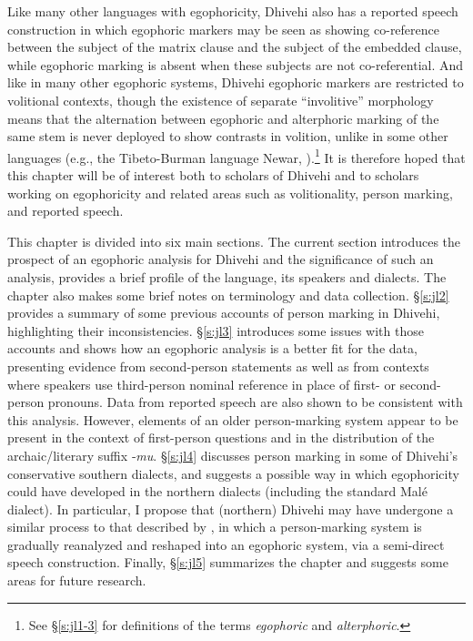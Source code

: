 \documentclass[output=paper]{langsci/langscibook}
\begin{document}
Like many other languages with egophoricity, Dhivehi also has a reported speech construction in which egophoric markers may be seen as showing co-reference between the subject of the matrix clause and the subject of the embedded clause, while egophoric marking is absent when these subjects are not co-referential. And like in many other egophoric systems, Dhivehi egophoric markers are restricted to volitional contexts, though the existence of separate “involitive” morphology means that the alternation between egophoric and alterphoric marking of the same stem is never deployed to show contrasts in volition, unlike in some other languages (e.g., the Tibeto-Burman language Newar, \citealt{Hale1980}).\footnote{See §‎\ref{s:jl1-3} for definitions of the terms \textit{egophoric} and \textit{alterphoric}.} It is therefore hoped that this chapter will be of interest both to scholars of Dhivehi and to scholars working on egophoricity and related areas such as volitionality, person marking, and reported speech.

\newpage
This chapter is divided into six main sections. The current section introduces the prospect of an egophoric analysis for Dhivehi and the significance of such an analysis, provides a brief profile of the language, its speakers and dialects. The chapter also makes some brief notes on terminology and data collection. §‎\ref{s:jl2} provides a summary of some previous accounts of person marking in Dhivehi, highlighting their inconsistencies. §‎\ref{s:jl3} introduces some issues with those accounts and shows how an egophoric analysis is a better fit for the data, presenting evidence from second-person statements as well as from contexts where speakers use third-person nominal reference in place of first- or second-person pronouns. Data from reported speech are also shown to be consistent with this analysis. However, elements of an older person-marking system appear to be present in the context of first-person questions and in the distribution of the archaic/literary suffix ‑\textit{mu}. §\ref{s:jl4} discusses person marking in some of Dhivehi’s conservative southern dialects, and suggests a possible way in which egophoricity could have developed in the northern dialects (including the standard Malé dialect). In particular, I propose that (northern) Dhivehi may have undergone a similar process to that described by \cite{WidmerZemp2017}, in which a person-marking system is gradually reanalyzed and reshaped into an egophoric system, via a semi-direct speech construction. Finally, §‎\ref{s:jl5} summarizes the chapter and suggests some areas for future research.
\end{document}
